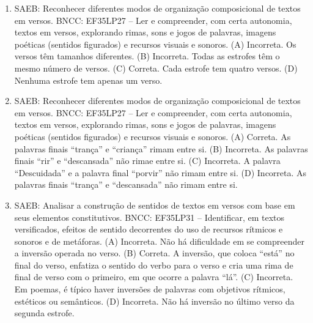 
\begin{enumerate}
\item
SAEB: Reconhecer diferentes modos de organização composicional de textos em versos.
BNCC: EF35LP27 -- Ler e compreender, com certa autonomia, textos em
versos, explorando rimas, sons e jogos de palavras, imagens poéticas
(sentidos figurados) e recursos visuais e sonoros.
(A) Incorreta. Os versos têm tamanhos diferentes.
(B) Incorreta. Todas as estrofes têm o mesmo número de versos.
(C) Correta. Cada estrofe tem quatro versos.
(D) Nenhuma estrofe tem apenas um verso.

\item
SAEB: Reconhecer diferentes modos de organização composicional de textos em versos.
BNCC: EF35LP27 -- Ler e compreender, com certa autonomia, textos em
versos, explorando rimas, sons e jogos de palavras, imagens poéticas
(sentidos figurados) e recursos visuais e sonoros.
(A) Correta. As palavras finais ``trança'' e ``criança'' rimam entre si.
(B) Incorreta. As palavras finais ``rir'' e ``descansada'' não rimae entre si.
(C) Incorreta. A palavra ``Descuidada'' e a palavra final ``porvir'' não rimam entre si.
(D) Incorreta. As palavras finais ``trança'' e ``descansada'' não rimam entre si.

\item
SAEB: Analisar a construção de sentidos de textos em versos com base em seus elementos constitutivos.
BNCC: EF35LP31 -- Identificar, em textos versificados, efeitos de sentido
decorrentes do uso de recursos rítmicos e sonoros e de metáforas.
(A) Incorreta. Não há dificuldade em se compreender a inversão operada no verso.
(B) Correta. A inversão, que coloca ``está'' no final do verso, enfatiza o sentido do verbo para o verso e cria uma rima de final de verso com o primeiro, em que ocorre a palavra ``lá''.
(C) Incorreta. Em poemas, é típico haver inversões de palavras com objetivos rítmicos, estéticos ou semânticos.
(D) Incorreta. Não há inversão no último verso da segunda estrofe.
\end{enumerate}



